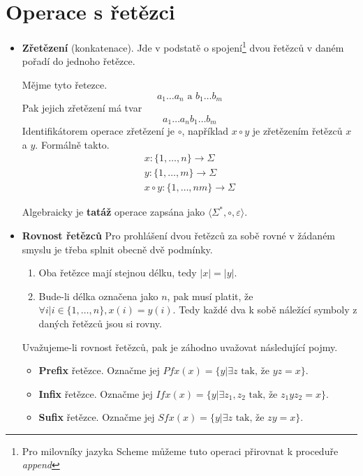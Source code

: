 \documentclass[10pt, a4paper, titlepage]{article}
\theoremstyle{note}
\begin{document}
\section{Operace s řetězci}
\begin{itemize}
\item
\textbf{Zřetězení} (konkatenace). Jde v podstatě o spojení\footnote{Pro milovníky jazyka Scheme můžeme tuto operaci přirovnat k proceduře \emph{append}}
dvou řetězců v daném pořadí do jednoho řetězce.

Mějme tyto řetezce. $$ a_{1}\ldots a_{n} \text{ a } b_{1}\ldots b_{m} $$
Pak jejich zřetězení má tvar $$ a_{1}\ldots a_{n}b_{1}\ldots b_{m} $$
Identifikátorem operace zřetězení je $\circ$, například $x\circ y$ je zřetězením řetězců $x$ a $y$.
Formálně takto.
\begin{gather*}
x : \lbrace 1,\ldots, n \rbrace \rightarrow \Sigma \\
y : \lbrace 1,\ldots, m \rbrace \rightarrow \Sigma \\
x \circ y : \lbrace 1,\ldots, nm \rbrace \rightarrow \Sigma
\end{gather*}

Algebraicky je \textbf{tatáž} operace zapsána jako $\langle \Sigma^{*}, \circ, \varepsilon \rangle$.

\item
\textbf{Rovnost řetězců}
Pro prohlášení dvou řetězců za sobě rovné v žádaném smyslu je třeba splnit obecně dvě podmínky.
\begin{enumerate}
\item
Oba řetězce mají stejnou délku, tedy $|x| = |y|$.

\item
Bude-li délka označena jako $n$, pak musí platit, že $\forall i | i \in \lbrace 1, \ldots, n \rbrace, x(i) = y(i)$.
Tedy každé dva k sobě náležící symboly z daných řetězců jsou si rovny.
\end{enumerate}
Uvažujeme-li rovnost řetězců, pak je záhodno uvažovat následující pojmy.
\begin{itemize}
\item
\textbf{Prefix} řetězce. Označme jej $Pfx(x) = \lbrace y | \exists z \text{ tak, že } yz = x \rbrace$.

\item
\textbf{Infix} řetězce. Označme jej $Ifx(x) = \lbrace y | \exists z_{1}, z_{2} \text{ tak, že } z_{1}yz_{2} = x \rbrace$.

\item
\textbf{Sufix} řetězce. Označme jej $Sfx(x) = \lbrace y | \exists z \text{ tak, že } zy = x \rbrace$.
\end{itemize}


\end{itemize}
\end{document}
